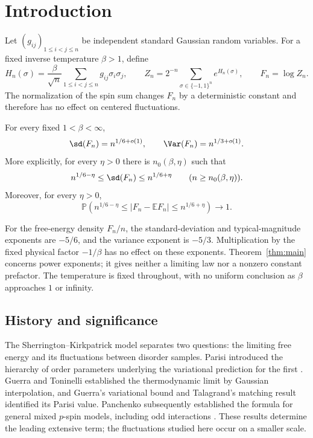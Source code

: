 \section{Introduction}\label{sec:introduction}
Let $(g_{ij})_{1\le i<j\le n}$ be independent standard Gaussian random variables. For a fixed inverse temperature $\beta>1$, define
\[
 H_n(\sigma)=\frac{\beta}{\sqrt n}\sum_{1\le i<j\le n}g_{ij}\sigma_i\sigma_j,
 \qquad Z_n=2^{-n}\sum_{\sigma\in\{-1,1\}^n}e^{H_n(\sigma)},
 \qquad F_n=\log Z_n.
\]
The normalization of the spin sum changes $F_n$ by a deterministic constant and therefore has no effect on centered fluctuations.

\begin{theorem}\label{thm:main}
For every fixed $1<\beta<\infty$,
\[
 \sd(F_n)=n^{1/6+o(1)},\qquad \Var(F_n)=n^{1/3+o(1)}.
\]
More explicitly, for every $\eta>0$ there is $n_0(\beta,\eta)$ such that
\[
 n^{1/6-\eta}\le\sd(F_n)\le n^{1/6+\eta}
 \qquad(n\ge n_0(\beta,\eta)).
\]
Moreover, for every $\eta>0$,
\[
 \mathbb P\!\left(n^{1/6-\eta}\le|F_n-\mathbb EF_n|
                         \le n^{1/6+\eta}\right)\longrightarrow1.
\]
\end{theorem}
For the free-energy density $F_n/n$, the standard-deviation and typical-magnitude exponents are $-5/6$, and the variance exponent is $-5/3$. Multiplication by the fixed physical factor $-1/\beta$ has no effect on these exponents. Theorem~\ref{thm:main} concerns power exponents; it gives neither a limiting law nor a nonzero constant prefactor. The temperature is fixed throughout, with no uniform conclusion as $\beta$ approaches $1$ or infinity.

\subsection{History and significance}
The Sherrington--Kirkpatrick model \cite{SK1975} separates two questions:
the limiting free energy and its fluctuations between disorder samples.
Parisi introduced the hierarchy of order parameters underlying the
variational prediction for the first \cite{Parisi1979}.
Guerra and Toninelli \cite{GuerraToninelli2002} established the
thermodynamic limit by Gaussian interpolation, and Guerra's variational
bound \cite{Guerra2003} and Talagrand's matching result
\cite{Talagrand2006} identified its Parisi value. Panchenko subsequently
established the formula for general mixed $p$-spin models, including odd
interactions \cite{Panchenko2014}. These results determine the leading
extensive term; the fluctuations studied here occur on a smaller scale.

